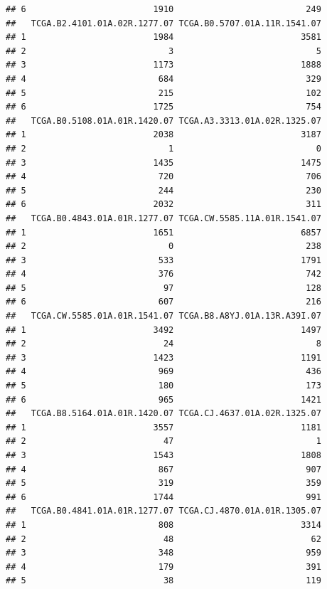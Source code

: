 \documentclass[
]{article}
\begin{document}
\begin{verbatim}
## 6                         1910                          249
##   TCGA.B2.4101.01A.02R.1277.07 TCGA.B0.5707.01A.11R.1541.07
## 1                         1984                         3581
## 2                            3                            5
## 3                         1173                         1888
## 4                          684                          329
## 5                          215                          102
## 6                         1725                          754
##   TCGA.B0.5108.01A.01R.1420.07 TCGA.A3.3313.01A.02R.1325.07
## 1                         2038                         3187
## 2                            1                            0
## 3                         1435                         1475
## 4                          720                          706
## 5                          244                          230
## 6                         2032                          311
##   TCGA.B0.4843.01A.01R.1277.07 TCGA.CW.5585.11A.01R.1541.07
## 1                         1651                         6857
## 2                            0                          238
## 3                          533                         1791
## 4                          376                          742
## 5                           97                          128
## 6                          607                          216
##   TCGA.CW.5585.01A.01R.1541.07 TCGA.B8.A8YJ.01A.13R.A39I.07
## 1                         3492                         1497
## 2                           24                            8
## 3                         1423                         1191
## 4                          969                          436
## 5                          180                          173
## 6                          965                         1421
##   TCGA.B8.5164.01A.01R.1420.07 TCGA.CJ.4637.01A.02R.1325.07
## 1                         3557                         1181
## 2                           47                            1
## 3                         1543                         1808
## 4                          867                          907
## 5                          319                          359
## 6                         1744                          991
##   TCGA.B0.4841.01A.01R.1277.07 TCGA.CJ.4870.01A.01R.1305.07
## 1                          808                         3314
## 2                           48                           62
## 3                          348                          959
## 4                          179                          391
## 5                           38                          119

\end{verbatim}
\end{document}
